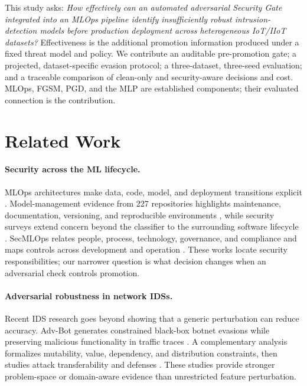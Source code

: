 \documentclass[runningheads]{llncs}
\begin{document}
This study asks: \emph{How effectively can an automated adversarial Security Gate integrated into an MLOps pipeline identify insufficiently robust intrusion-detection models before production deployment across heterogeneous IoT/IIoT datasets?} Effectiveness is the additional promotion information produced under a fixed threat model and policy. We contribute an auditable pre-promotion gate; a projected, dataset-specific evasion protocol; a three-dataset, three-seed evaluation; and a traceable comparison of clean-only and security-aware decisions and cost. MLOps, FGSM, PGD, and the MLP are established components; their evaluated connection is the contribution.

\section{Related Work}
\paragraph{Security across the ML lifecycle.}
MLOps architectures make data, code, model, and deployment transitions explicit \cite{kreuzberger2023mlops}. Model-management evidence from 227 repositories highlights maintenance, documentation, versioning, and reproducible environments \cite{latendresse2025management}, while security surveys extend concern beyond the classifier to the surrounding software lifecycle \cite{chen2024security}. SecMLOps relates people, process, technology, governance, and compliance \cite{zhang2022secmlops} and maps controls across development and operation \cite{zhang2026secmlops}. These works locate security responsibilities; our narrower question is what decision changes when an adversarial check controls promotion.

\paragraph{Adversarial robustness in network IDSs.}
Recent IDS research goes beyond showing that a generic perturbation can reduce accuracy. Adv-Bot generates constrained black-box botnet evasions while preserving malicious functionality in traffic traces \cite{debicha2023advbot}. A complementary analysis formalizes mutability, value, dependency, and distribution constraints, then studies attack transferability and defenses \cite{alhussien2024constraining}. These studies provide stronger problem-space or domain-aware evidence than unrestricted feature perturbation.
\end{document}

